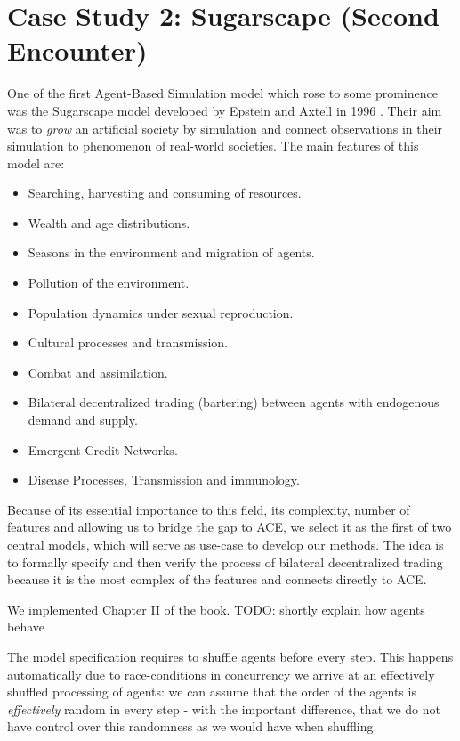\section{Case Study 2: Sugarscape (Second Encounter)}
One of the first  Agent-Based Simulation model which rose to some prominence was the Sugarscape model developed by Epstein and Axtell in 1996 \cite{epstein_growing_1996}. Their aim was to \textit{grow} an artificial society by simulation and connect observations in their simulation to phenomenon of real-world societies. The main features of this model are:

\begin{itemize}
	\item Searching, harvesting and consuming of resources.
	\item Wealth and age distributions.
	\item Seasons in the environment and migration of agents.
	\item Pollution of the environment.
	\item Population dynamics under sexual reproduction.
	\item Cultural processes and transmission.
	\item Combat and assimilation.
	\item Bilateral decentralized trading (bartering) between agents with endogenous demand and supply.
	\item Emergent Credit-Networks.
	\item Disease Processes, Transmission and immunology.
\end{itemize}

Because of its essential importance to this field, its complexity, number of features and allowing us to bridge the gap to ACE, we select it as the first of two central models, which will serve as use-case to develop our methods. The idea is to formally specify and then verify the process of bilateral decentralized trading because it is the most complex of the features and connects directly to ACE.

We implemented Chapter II of the book. TODO: shortly explain how agents behave

The model specification requires to shuffle agents before every step. This happens automatically due to race-conditions in concurrency we arrive at an effectively shuffled processing of agents: we can assume that the order of the agents is \textit{effectively} random in every step - with the important difference, that we do not have control over this randomness as we would have when shuffling.

